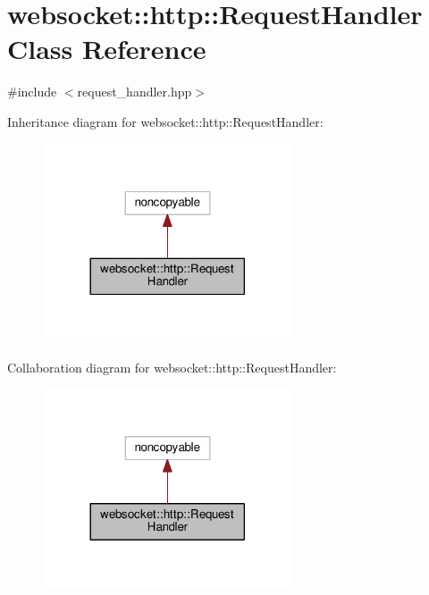 \hypertarget{classwebsocket_1_1http_1_1RequestHandler}{}\section{websocket\+:\+:http\+:\+:Request\+Handler Class Reference}
\label{classwebsocket_1_1http_1_1RequestHandler}


{\ttfamily \#include $<$request\+\_\+handler.\+hpp$>$}



Inheritance diagram for websocket\+:\+:http\+:\+:Request\+Handler\+:\nopagebreak
\begin{figure}[H]
\begin{center}
\leavevmode
\includegraphics[width=209pt]{classwebsocket_1_1http_1_1RequestHandler__inherit__graph}
\end{center}
\end{figure}


Collaboration diagram for websocket\+:\+:http\+:\+:Request\+Handler\+:\nopagebreak
\begin{figure}[H]
\begin{center}
\leavevmode
\includegraphics[width=209pt]{classwebsocket_1_1http_1_1RequestHandler__coll__graph}
\end{center}
\end{figure}
